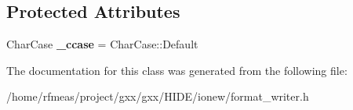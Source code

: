 \subsection*{Protected Attributes}
\begin{DoxyCompactItemize}
\item 
Char\+Case {\bfseries \+\_\+ccase} = Char\+Case\+::\+Default\hypertarget{classgxx_1_1io_1_1CharStrSpec_abeda9480c8b16d1c07bce613ca42be1e}{}\label{classgxx_1_1io_1_1CharStrSpec_abeda9480c8b16d1c07bce613ca42be1e}

\end{DoxyCompactItemize}


The documentation for this class was generated from the following file\+:\begin{DoxyCompactItemize}
\item 
/home/rfmeas/project/gxx/gxx/\+H\+I\+D\+E/ionew/format\+\_\+writer.\+h\end{DoxyCompactItemize}
